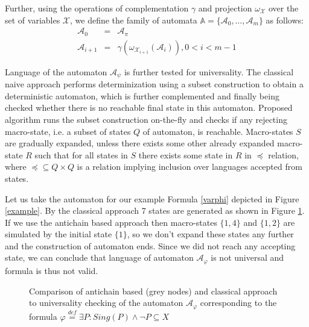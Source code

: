\documentclass{eeict}
\begin{document}
Further, using the operations of complementation $\gamma$ and projection
$\omega_{\mathcal{X}}$ over the set of variables $\mathcal{X}$, we define the
family of automata $\mathds{A} = \{\mathcal{A}_0,\ldots,\mathcal{A}_m\}$ as follows:
\begin{eqnarray}
 \mathcal{A}_0 & = & \mathcal{A}_\pi\\
 \mathcal{A}_{i+1} & = & \gamma(\omega_{\mathcal{X}_{i+1}} (\mathcal{A}_i)), 0 <
 i < m - 1
\end{eqnarray}

Language of the automaton $\mathcal{A}_\psi$ is further tested for universality.
The classical naive approach performs determinization using a subset construction to obtain
a deterministic automaton, which is further complemented and finally being
checked whether there is no reachable final state in this automaton. Proposed
algorithm \cite{anti} runs the subset construction on-the-fly and checks if any rejecting macro-state, i.e. a subset of states $Q$ of automaton,
is reachable. Macro-states $S$ are gradually expanded, unless there exists some
other already expanded macro-state $R$ such that for all states in $S$ there
exists some state in $R$ in $\preceq$ relation, where $\preceq \subseteq Q
\times Q$ is a relation implying inclusion over languages accepted from states.

Let us take the automaton for our example Formula \ref{varphi} depicted in
Figure \ref{example}. By the classical approach 7 states are generated as shown
in Figure \ref{compare}. If we use the antichain based approach then
macro-states $\{1, 4\}$ and $\{1, 2\}$ are simulated by the initial state
$\{1\}$, so we don't expand these states any further and the construction of automaton
ends.
Since we did not reach any accepting state, we can conclude that language of
automaton $\mathcal{A}_\varphi$ is not universal and formula is thus not valid.

\begin{figure}
 \begin{center}
 \end{center}
 \caption{Comparison of antichain based (grey nodes) and classical approach to
 universality checking of the automaton $\mathcal{A}_\varphi$
 corresponding to the formula $\varphi \overset{\mathit{def}}{=} \exists P:
 Sing(P) \wedge\neg P \subseteq X$}\label{compare}
\end{figure}
\end{document}
